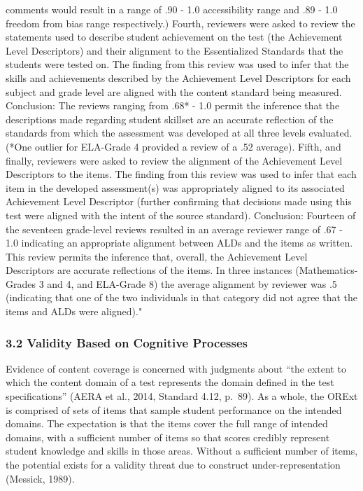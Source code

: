 \documentclass[]{article}
\begin{document}
comments would result in a range of .90 - 1.0 accessibility range and
.89 - 1.0 freedom from bias range respectively.) Fourth, reviewers were
asked to review the statements used to describe student achievement on
the test (the Achievement Level Descriptors) and their alignment to the
Essentialized Standards that the students were tested on. The finding
from this review was used to infer that the skills and achievements
described by the Achievement Level Descriptors for each subject and
grade level are aligned with the content standard being measured.
Conclusion: The reviews ranging from .68* - 1.0 permit the inference
that the descriptions made regarding student skillset are an accurate
reflection of the standards from which the assessment was developed at
all three levels evaluated. (*One outlier for ELA-Grade 4 provided a
review of a .52 average). Fifth, and finally, reviewers were asked to
review the alignment of the Achievement Level Descriptors to the items.
The finding from this review was used to infer that each item in the
developed assessment(s) was appropriately aligned to its associated
Achievement Level Descriptor (further confirming that decisions made
using this test were aligned with the intent of the source standard).
Conclusion: Fourteen of the seventeen grade-level reviews resulted in an
average reviewer range of .67 - 1.0 indicating an appropriate alignment
between ALDs and the items as written. This review permits the inference
that, overall, the Achievement Level Descriptors are accurate
reflections of the items. In three instances (Mathematics-Grades 3 and
4, and ELA-Grade 8) the average alignment by reviewer was .5 (indicating
that one of the two individuals in that category did not agree that the
items and ALDs were aligned)."

\subsubsection{3.2 Validity Based on Cognitive
Processes}\label{validity-based-on-cognitive-processes}

Evidence of content coverage is concerned with judgments about ``the
extent to which the content domain of a test represents the domain
defined in the test specifications'' (AERA et al., 2014, Standard 4.12,
p.~89). As a whole, the ORExt is comprised of sets of items that sample
student performance on the intended domains. The expectation is that the
items cover the full range of intended domains, with a sufficient number
of items so that scores credibly represent student knowledge and skills
in those areas. Without a sufficient number of items, the potential
exists for a validity threat due to construct under-representation
(Messick, 1989).
\end{document}

